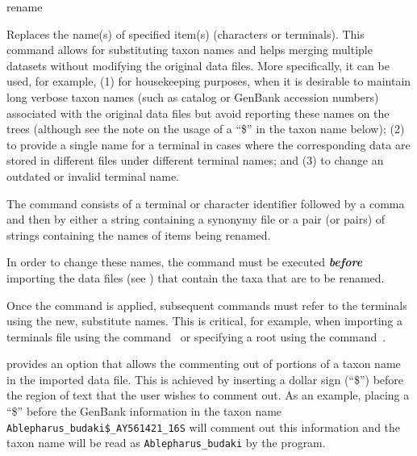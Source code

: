 
\begin{command}{rename}{}


\begin{poydescription} 
Replaces the name(s) of specified item(s) (characters or terminals). This command allows 
for substituting taxon names and helps merging multiple datasets without modifying the original
data files. More specifically, it can be used, for example, (1) for housekeeping purposes,
when it is desirable to maintain long verbose taxon names (such as catalog or GenBank
accession numbers) associated with the original data files but avoid reporting these 
names on the trees (although see the note on the usage of a ``\$'' in the taxon name below); 
(2) to provide a single name for a terminal in cases where the corresponding
data are stored in different files under different terminal names; and (3) to change an
outdated or invalid terminal name.

The command consists of a terminal or character identifier followed by a comma and then by
either a string containing a synonymy file or a pair (or pairs) of strings containing the names of
items being renamed.

In order to change these names, the command  must be
executed {\bf \emph{before}} importing the data files (see )
that contain the taxa that are to be renamed.
\end{poydescription} 

\begin{statement}
Once the command  is applied, subsequent commands 
must refer to the terminals using the new, substitute names. This is critical, for example,
when importing a terminals file using the command~ or specifying
a root using the command~.
\end{statement}

\begin{statement}
\poy provides an option that allows the commenting out of portions of a taxon name 
in the imported data file. This is achieved by inserting a dollar sign (``\$'') before the region 
of text that the user wishes to comment out. As an example, placing a ``\$'' before the 
GenBank information in the taxon name \texttt{Ablepharus\_budaki\$\_AY561421\_16S} 
will comment out this information and the taxon name will be read as 
\texttt{Ablepharus\_budaki} by the program.
\end{statement}


\end{command}
